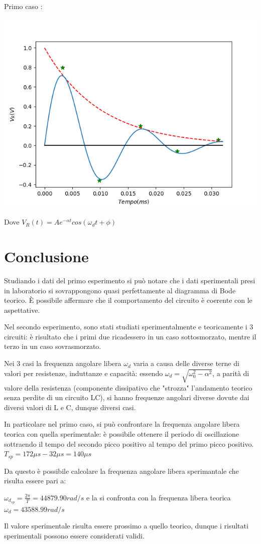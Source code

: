     \hspace{0.5 cm}
    \begin{minipage}{.4\linewidth}
        \hspace{0.5 cm}
        Primo caso : \par
        \includegraphics[width = 9 cm]{secondoese.png}
        \par
        \hspace{0.5 cm} Dove \color{blue} $V_R(t) = Ae^{-\alpha t} cos(\omega_d t + \phi)$
    \end{minipage}

    \section{Conclusione}
    Studiando i dati del primo esperimento si può notare che i dati sperimentali presi in laboratorio si sovrappongono quasi perfettamente
    al diagramma di Bode teorico. È possibile affermare che il comportamento del circuito è coerente con le aspettative. \par
    Nel secondo esperimento, sono stati studiati sperimentalmente e teoricamente i 3 circuiti: è risultato che i primi due ricadessero
    in un caso sottosmorzato, mentre il terzo in un caso sovrasmorzato.\par
    Nei 3 casi la frequenza angolare libera $\omega_d$ varia a causa delle diverse terne di valori per resistenze, induttanze e capacità:
    essendo $\omega_d = \sqrt{\omega_0^2 - \alpha^2}$, a parità di valore della resistenza (componente dissipativo che "strozza" l'andamento teorico senza perdite di un circuito LC),
    si hanno frequenze angolari diverse dovute dai diversi valori di L e C, dunque diversi casi. \par
    In particolare nel primo caso, si può confrontare la frequenza angolare libera teorica con quella sperimentale: è possibile ottenere il periodo di oscillazione sottraendo il tempo del secondo picco positivo 
    al tempo del primo picco positivo.  $T_{sp} = 172 \mu s - 32 \mu s = 140 \mu s$ \par
    Da questo è possibile calcolare la frequenza angolare libera sperimantale che risulta essere pari a: \par
    $\omega_{d_{sp}} = \frac{2\pi}{T} = 44879.90 rad/s$ e la si confronta con la frequenza libera teorica $\omega_d = 43588.99 rad/s$ \par
    Il valore sperimentale risulta essere prossimo a quello teorico, dunque i risultati sperimentali possono essere considerati validi.
    
